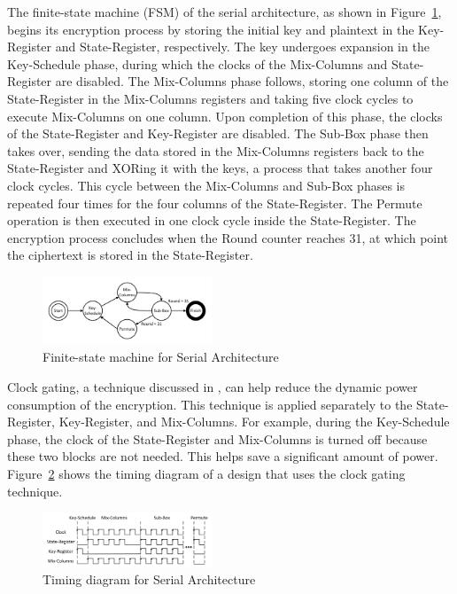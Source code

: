 \documentclass[final,5p,times,twocolumn]{elsarticle}
\begin{document}
The finite-state machine (FSM) of the serial architecture, as shown in Figure~\ref{serial_fsm_fig}, begins its encryption process by storing the initial key and plaintext in the Key-Register and State-Register, respectively.
The key undergoes expansion in the Key-Schedule phase, during which the clocks of the Mix-Columns and State-Register are disabled.
The Mix-Columns phase follows, storing one column of the State-Register in the Mix-Columns registers and taking five clock cycles to execute Mix-Columns on one column.
Upon completion of this phase, the clocks of the State-Register and Key-Register are disabled.
The Sub-Box phase then takes over, sending the data stored in the Mix-Columns registers back to the State-Register and XORing it with the keys, a process that takes another four clock cycles.
This cycle between the Mix-Columns and Sub-Box phases is repeated four times for the four columns of the State-Register.
The Permute operation is then executed in one clock cycle inside the State-Register.
The encryption process concludes when the Round counter reaches 31, at which point the ciphertext is stored in the State-Register.

\begin{figure}[h]%
    \centering
    \includegraphics[width=0.45\textwidth]{./fig/serial-fsm.pdf}
    \caption{Finite-state machine for Serial Architecture}\label{serial_fsm_fig}
\end{figure}

Clock gating, a technique discussed in \cite{Shahbazi2021}, can help reduce the dynamic power consumption of the encryption.
This technique is applied separately to the State-Register, Key-Register, and Mix-Columns.
For example, during the Key-Schedule phase, the clock of the State-Register and Mix-Columns is turned off because these two blocks are not needed.
This helps save a significant amount of power. Figure~\ref{serial_time_diagrm} shows the timing diagram of a design that uses the clock gating technique.

\begin{figure}[h]%
    \centering
    \includegraphics[width=0.45\textwidth]{./fig/serial-time.pdf}
    \caption{Timing diagram for Serial Architecture}\label{serial_time_diagrm}
\end{figure}
\end{document}
